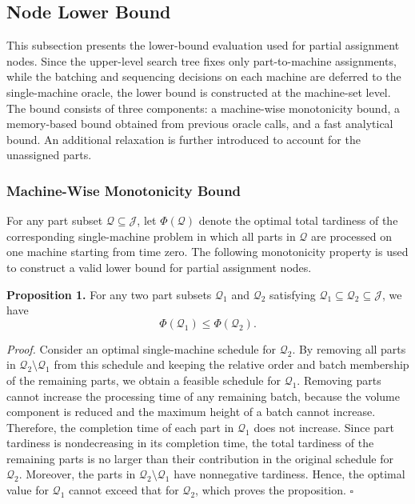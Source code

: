\documentclass[review,3p,times,authoryear]{elsarticle}
\newcounter{proposition}
\begin{document}
\subsection{Node Lower Bound}
\label{subsec:node_lb}

This subsection presents the lower-bound evaluation used for partial
assignment nodes. Since the upper-level search tree fixes only
part-to-machine assignments, while the batching and sequencing decisions on
each machine are deferred to the single-machine oracle, the lower bound is
constructed at the machine-set level. The bound consists of three components:
a machine-wise monotonicity bound, a memory-based bound obtained from
previous oracle calls, and a fast analytical bound. An additional relaxation
is further introduced to account for the unassigned parts.

\subsubsection{Machine-Wise Monotonicity Bound}

For any part subset $\mathcal{Q}\subseteq\mathcal{J}$, let
$\Phi(\mathcal{Q})$ denote the optimal total tardiness of the corresponding
single-machine problem in which all parts in $\mathcal{Q}$ are processed on
one machine starting from time zero. The following monotonicity property is
used to construct a valid lower bound for partial assignment nodes.

\textbf{Proposition 1.}
For any two part subsets $\mathcal{Q}_1$ and $\mathcal{Q}_2$ satisfying
$\mathcal{Q}_1\subseteq \mathcal{Q}_2\subseteq\mathcal{J}$, we have
\[
\Phi(\mathcal{Q}_1)\le \Phi(\mathcal{Q}_2).
\]

\textit{Proof.}
Consider an optimal single-machine schedule for $\mathcal{Q}_2$. By removing
all parts in $\mathcal{Q}_2\setminus\mathcal{Q}_1$ from this schedule and
keeping the relative order and batch membership of the remaining parts, we
obtain a feasible schedule for $\mathcal{Q}_1$. Removing parts cannot
increase the processing time of any remaining batch, because the volume
component is reduced and the maximum height of a batch cannot increase.
Therefore, the completion time of each part in $\mathcal{Q}_1$ does not
increase. Since part tardiness is nondecreasing in its completion time, the
total tardiness of the remaining parts is no larger than their contribution
in the original schedule for $\mathcal{Q}_2$. Moreover, the parts in
$\mathcal{Q}_2\setminus\mathcal{Q}_1$ have nonnegative tardiness. Hence,
the optimal value for $\mathcal{Q}_1$ cannot exceed that for
$\mathcal{Q}_2$, which proves the proposition.
\hfill $\square$
\end{document}

